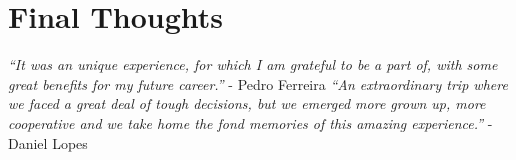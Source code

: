 \section{Final Thoughts}
\textit{“It was an unique experience, for which I am grateful to be a part of,
with some great benefits for my future career.”} - Pedro Ferreira
\newline \newline
\textit{“An extraordinary trip where we faced a great deal of tough decisions,
but we emerged more grown up, more cooperative and we take home the fond
memories of this amazing experience.”} - Daniel Lopes
